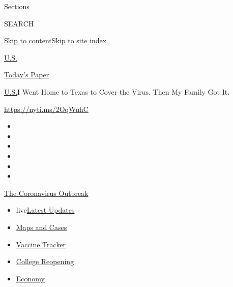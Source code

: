 Sections

SEARCH

\protect\hyperlink{site-content}{Skip to
content}\protect\hyperlink{site-index}{Skip to site index}

\href{https://www.nytimes3xbfgragh.onion/section/us}{U.S.}

\href{https://myaccount.nytimes3xbfgragh.onion/auth/login?response_type=cookie\&client_id=vi}{}

\href{https://www.nytimes3xbfgragh.onion/section/todayspaper}{Today's
Paper}

\href{/section/us}{U.S.}\textbar{}I Went Home to Texas to Cover the
Virus. Then My Family Got It.

\url{https://nyti.ms/2OqWuhC}

\begin{itemize}
\item
\item
\item
\item
\item
\item
\end{itemize}

\href{https://www.nytimes3xbfgragh.onion/news-event/coronavirus?action=click\&pgtype=Article\&state=default\&region=TOP_BANNER\&context=storylines_menu}{The
Coronavirus Outbreak}

\begin{itemize}
\tightlist
\item
  live\href{https://www.nytimes3xbfgragh.onion/2020/08/04/world/coronavirus-cases.html?action=click\&pgtype=Article\&state=default\&region=TOP_BANNER\&context=storylines_menu}{Latest
  Updates}
\item
  \href{https://www.nytimes3xbfgragh.onion/interactive/2020/us/coronavirus-us-cases.html?action=click\&pgtype=Article\&state=default\&region=TOP_BANNER\&context=storylines_menu}{Maps
  and Cases}
\item
  \href{https://www.nytimes3xbfgragh.onion/interactive/2020/science/coronavirus-vaccine-tracker.html?action=click\&pgtype=Article\&state=default\&region=TOP_BANNER\&context=storylines_menu}{Vaccine
  Tracker}
\item
  \href{https://www.nytimes3xbfgragh.onion/2020/08/02/us/covid-college-reopening.html?action=click\&pgtype=Article\&state=default\&region=TOP_BANNER\&context=storylines_menu}{College
  Reopening}
\item
  \href{https://www.nytimes3xbfgragh.onion/live/2020/08/04/business/stock-market-today-coronavirus?action=click\&pgtype=Article\&state=default\&region=TOP_BANNER\&context=storylines_menu}{Economy}
\end{itemize}

